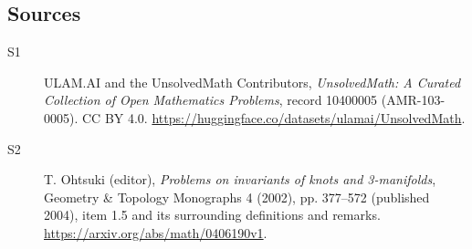 \documentclass[11pt]{article}
\begin{document}
\subsection{Sources}
\begin{description}
\item[\hypertarget{source:10400005:1}{S1}] ULAM.AI and the UnsolvedMath Contributors, \emph{UnsolvedMath: A Curated Collection of Open Mathematics Problems}, record 10400005 (AMR-103-0005). CC BY 4.0. \url{https://huggingface.co/datasets/ulamai/UnsolvedMath}.
\item[\hypertarget{source:10400005:2}{S2}] T. Ohtsuki (editor), \emph{Problems on invariants of knots and 3-manifolds}, Geometry \& Topology Monographs 4 (2002), pp. 377--572 (published 2004), item 1.5 and its surrounding definitions and remarks. \url{https://arxiv.org/abs/math/0406190v1}.
\end{description}
\label{end:10400005}
\end{document}

